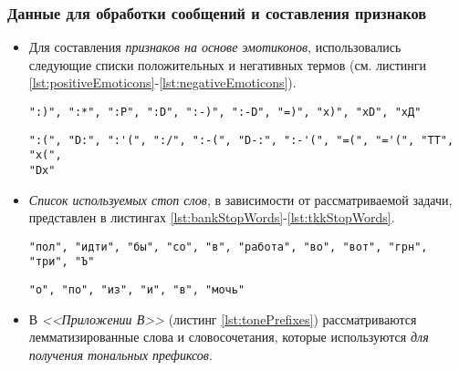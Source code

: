 \subsubsection{Данные для обработки сообщений и составления признаков}

    

    \begin{itemize}
        \item Для составления {\it признаков на основе эмотиконов}, использовались следующие
        списки положительных и негативных термов (см. листинги
        \ref{lst:positiveEmoticons}-\ref{lst:negativeEmoticons}).

        \begin{lstlisting}[caption="Список положительных эмотиконов", label={lst:positiveEmoticons}]
":)", ":*", ":P", ":D", ":-)", ":-D", "=)", "x)", "xD", "хД"
        \end{lstlisting}
        \begin{lstlisting}[caption="Список негативных эмотиконов", label={lst:negativeEmoticons}]
":(", "D:", ":'(", ":/", ":-(", "D-:", ":-'(", "=(", "='(", "TT", "x(",
"Dx"
        \end{lstlisting}

        \item {\it Список используемых стоп слов}, в зависимости от рассматриваемой задачи,
            представлен в листингах \ref{lst:bankStopWords}-\ref{lst:tkkStopWords}.

        \begin{lstlisting}[caption="Список стоп слов для задачи {\it BANK}", label={lst:bankStopWords}]
"пол", "идти", "бы", "со", "в", "работа", "во", "вот", "грн", "три", "Ъ"
        \end{lstlisting}

        \begin{lstlisting}[caption="Список стоп слов для задачи {\it TKK}", label={lst:tkkStopWords}]
"о", "по", "из", "и", "в", "мочь"
        \end{lstlisting}

        \item В {\it <<Приложении В>>} (листинг \ref{lst:tonePrefixes})
            рассматриваются лемматизированные слова и словосочетания, которые
            используются {\it для получения тональных префиксов}.
    \end{itemize}
